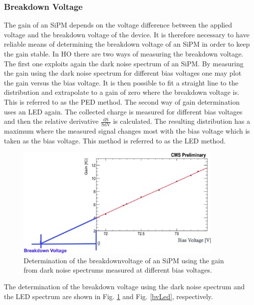 \subsubsection{Breakdown Voltage}
The gain of an SiPM depends on the voltage difference between the applied voltage and the breakdown voltage of the device. It is therefore necessary to have reliable means of determining the breakdown voltage of an SiPM in order to keep the gain stable. In HO there are two ways of measuring the breakdown voltage. The first one exploits again the dark noise spectrum of an SiPM. By measuring the gain using the dark noise spectrum for different bias voltages one may plot the gain versus the bias voltage. It is then possible to fit a straight line to the distribution and extrapolate to a gain of zero where the breakdown voltage is. This is referred to as the PED method. The second way of gain determination uses an LED again. The collected charge is measured for different bias voltages and then the relative derivative $\frac{\text{dS}}{\text{SdV}}$ is calculated. The resulting distribution has a maximum where the measured signal changes most with the bias voltage which is taken as the bias voltage. This method is referred to as the LED method.
\begin{figure}[bh]
\centering
\includegraphics[width=0.9\textwidth]{Bilder/bvPedDetermination.png}
\caption{Determination of the breakdownvoltage of an SiPM using the gain from dark noise spectrums measured at different bias voltages.}
\label{bvPed}
\end{figure}
The determination of the breakdown voltage using the dark noise spectrum and the LED spectrum are shown in Fig. \ref{bvPed} and Fig. \ref{bvLed}, respectively.
